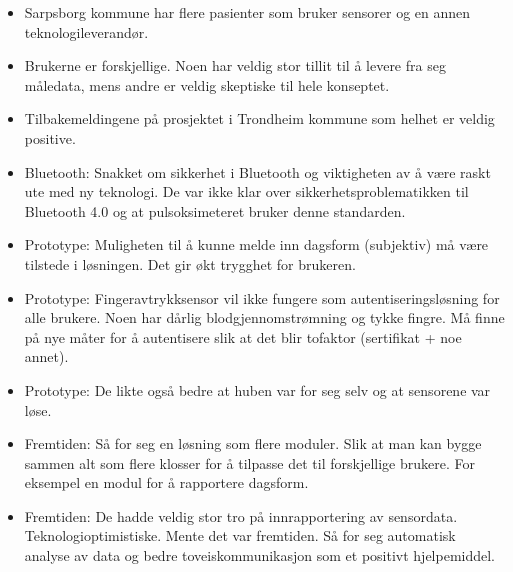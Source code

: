 \begin{itemize}
  \begin{itemize}
  \tightlist
  \item
    Sarpsborg kommune har flere pasienter som bruker sensorer og en
    annen teknologileverandør.
  \item
    Brukerne er forskjellige. Noen har veldig stor tillit til å levere
    fra seg måledata, mens andre er veldig skeptiske til hele konseptet.
  \item
    Tilbakemeldingene på prosjektet i Trondheim kommune som helhet er
    veldig positive.
  \item
    Bluetooth: Snakket om sikkerhet i Bluetooth og viktigheten av å være
    raskt ute med ny teknologi. De var ikke klar over
    sikkerhetsproblematikken til Bluetooth 4.0 og at pulsoksimeteret
    bruker denne standarden.
  \item
    Prototype: Muligheten til å kunne melde inn dagsform (subjektiv) må
    være tilstede i løsningen. Det gir økt trygghet for brukeren.
  \item
    Prototype: Fingeravtrykksensor vil ikke fungere som
    autentiseringsløsning for alle brukere. Noen har dårlig
    blodgjennomstrømning og tykke fingre. Må finne på nye måter for å
    autentisere slik at det blir tofaktor (sertifikat + noe annet).
  \item
    Prototype: De likte også bedre at huben var for seg selv og at
    sensorene var løse.
  \item
    Fremtiden: Så for seg en løsning som flere moduler. Slik at man kan bygge
    sammen alt som flere klosser for å tilpasse det til forskjellige
    brukere. For eksempel en modul for å rapportere dagsform.
  \item
    Fremtiden: De hadde veldig stor tro på innrapportering av sensordata.
    Teknologioptimistiske. Mente det var fremtiden. Så for seg
    automatisk analyse av data og bedre toveiskommunikasjon som et
    positivt hjelpemiddel.
  \end{itemize}
\end{itemize}
